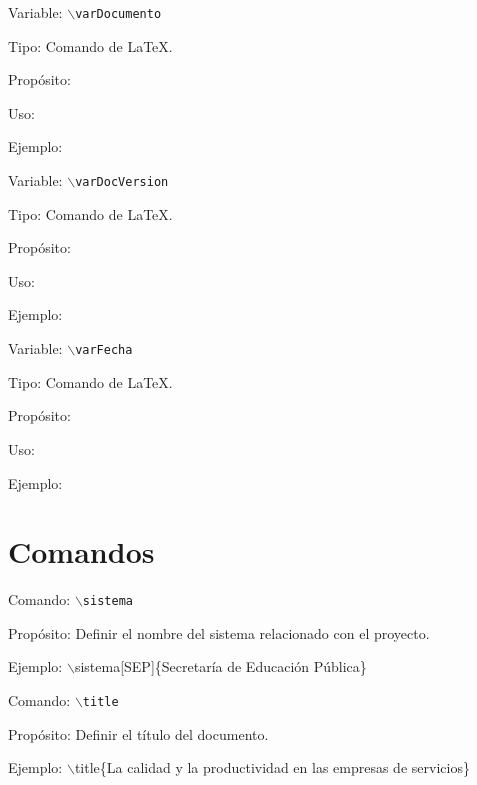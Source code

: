 \begin{Cdescription}
	\item[Variable:] {\tt $\backslash$varDocumento}
	\item[Tipo:] Comando de \LaTeX.
	\item[Propósito:]
	\item[Uso:]
	\item[Ejemplo:]
\end{Cdescription}

\begin{Cdescription}
	\item[Variable:] {\tt $\backslash$varDocVersion}
	\item[Tipo:] Comando de \LaTeX.
	\item[Propósito:]
	\item[Uso:]
	\item[Ejemplo:]
\end{Cdescription}

\begin{Cdescription}
	\item[Variable:] {\tt $\backslash$varFecha}
	\item[Tipo:] Comando de \LaTeX.
	\item[Propósito:]
	\item[Uso:]
	\item[Ejemplo:]
\end{Cdescription}


\section{Comandos}

\begin{Cdescription}
	\item[Comando:] {\tt $\backslash$sistema}
	\item[Propósito:] Definir el nombre del sistema relacionado con el proyecto.
	\item[Ejemplo:] $\backslash$sistema[SEP]\{Secretaría de Educación Pública\}
	
\end{Cdescription}

\begin{Cdescription}
	\item[Comando:] {\tt $\backslash$title}
	\item[Propósito:] Definir el título del documento.
	\item[Ejemplo:] $\backslash$title\{La calidad y la productividad en las empresas de servicios\}
\end{Cdescription}


